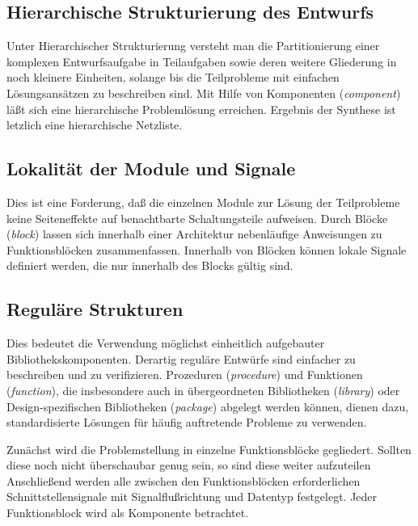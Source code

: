 \documentclass{article}
\begin{document}
\subsection{Hierarchische Strukturierung des Entwurfs}
Unter Hierarchischer Strukturierung versteht man die Partitionierung einer komplexen Entwurfsaufgabe
in Teilaufgaben sowie deren weitere Gliederung in noch kleinere Einheiten, solange bis die 
Teilprobleme mit einfachen Lösungsansätzen zu beschreiben sind. Mit Hilfe von Komponenten 
(\emph{component}) läßt sich eine hierarchische Problemlösung erreichen. Ergebnis der Synthese ist
letzlich eine hierarchische Netzliste.

\subsection{Lokalität der Module und Signale}
Dies ist eine Forderung, daß die einzelnen Module zur Lösung der Teilprobleme keine Seiteneffekte
auf benachtbarte Schaltungsteile aufweisen. Durch Blöcke (\emph{block}) lassen sich innerhalb einer
Architektur nebenläufige Anweisungen zu Funktionsblöcken zusammenfassen. Innerhalb von Blöcken 
können lokale Signale definiert werden, die nur innerhalb des Blocks gültig sind.

\subsection{Reguläre Strukturen}
Dies bedeutet die Verwendung möglichst einheitlich aufgebauter Bibliothekskomponenten. Derartig
reguläre Entwürfe sind einfacher zu beschreiben und zu verifizieren. Prozeduren (\emph{procedure})
und Funktionen (\emph{function}), die insbesondere auch in übergeordneten Bibliotheken 
(\emph{library}) oder Design-spezifischen Bibliotheken (\emph{package}) abgelegt werden können,
dienen dazu, standardisierte Lösungen für häufig auftretende Probleme zu verwenden.

\vspace{10mm}
Zunächst wird die Problemstellung in einzelne Funktionsblöcke gegliedert. Sollten diese noch nicht 
überschaubar genug sein, so sind diese weiter aufzuteilen Anschließend werden alle zwischen den
Funktionsblöcken erforderlichen Schnittstellensignale mit Signalflußrichtung und Datentyp 
festgelegt. Jeder Funktionsblock wird als Komponente betrachtet.
\end{document}
